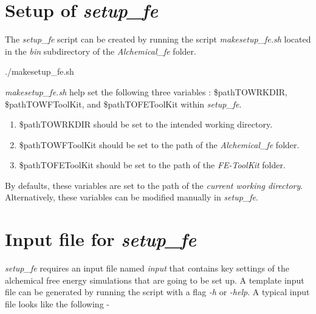 \documentclass[11pt,letterpaper,titlepage]{article}
\begin{document}
\vspace{1cm}
\section{Setup of \textit{setup\_fe}}
\vspace{1cm}

The \textit{setup\_fe} script can be created by running the script \textit{makesetup\_fe.sh} located in the \textit{bin} subdirectory
of the \textit{Alchemical\_fe} folder. 

\vspace{0.1cm}
\centerline{./makesetup\_fe.sh}
\vspace{0.1cm}

\textit{makesetup\_fe.sh} help set the following three variables : \${pathTOWRKDIR}, 
\${pathTOWFToolKit}, and \${pathTOFEToolKit} within \textit{setup\_fe}. 
\begin{enumerate}
	\item{\${pathTOWRKDIR} should be set to the intended working directory.}
	\item{\${pathTOWFToolKit} should be set to the path of the \textit{Alchemical\_fe} folder.}
	\item{\${pathTOFEToolKit} should be set to the path of the \textit{FE-ToolKit} folder.}
\end{enumerate}
By defaults, these variables are set to the path of the \textit{current working directory}. Alternatively, these variables 
can be modified manually in \textit{setup\_fe}.


\vspace{1cm}
\section{Input file for \textit{setup\_fe}}
\vspace{1cm}

\textit{setup\_fe} requires an input file named \textit{input} that contains key settings of the
alchemical free energy simulations that are going to be set up. A template input file can be
generated by running the script with a flag \textit{-h} or \textit{-help}. A typical input file looks like the
following -
\end{document}
